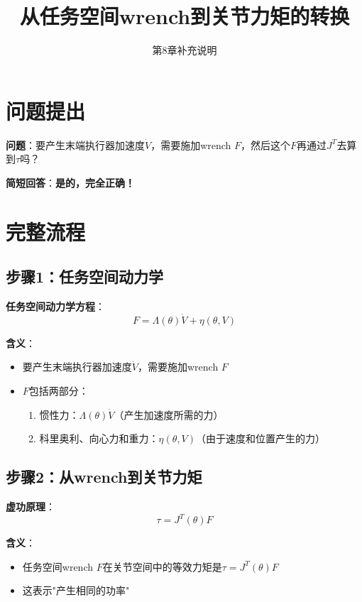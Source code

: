 \documentclass[12pt,a4paper]{article}
\title{从任务空间wrench到关节力矩的转换}
\author{第8章补充说明}
\date{}
\begin{document}
\maketitle

\section{问题提出}

\textbf{问题}：要产生末端执行器加速度$\dot{V}$，需要施加wrench $F$，然后这个$F$再通过$J^T$去算到$\tau$吗？

\textbf{简短回答}：\textbf{是的，完全正确！}

\section{完整流程}

\subsection{步骤1：任务空间动力学}

\textbf{任务空间动力学方程}：
\begin{equation}
F = \Lambda(\theta)\dot{V} + \eta(\theta, V) \tag{8.89}
\end{equation}

\textbf{含义}：
\begin{itemize}
\item 要产生末端执行器加速度$\dot{V}$，需要施加wrench $F$
\item $F$包括两部分：
\begin{enumerate}
\item 惯性力：$\Lambda(\theta)\dot{V}$（产生加速度所需的力）
\item 科里奥利、向心力和重力：$\eta(\theta, V)$（由于速度和位置产生的力）
\end{enumerate}
\end{itemize}

\subsection{步骤2：从wrench到关节力矩}

\textbf{虚功原理}：
\begin{equation}
\tau = J^T(\theta)F \tag{8.51}
\end{equation}

\textbf{含义}：
\begin{itemize}
\item 任务空间wrench $F$在关节空间中的等效力矩是$\tau = J^T(\theta)F$
\item 这表示"产生相同的功率"
\end{itemize}
\end{document}

